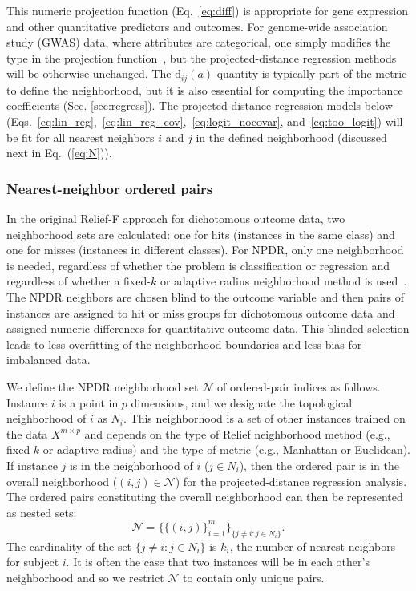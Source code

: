 \documentclass[10pt]{article}
\begin{document}
This numeric projection function (Eq.~\ref{eq:diff}) is appropriate for gene expression and other quantitative predictors and outcomes. For genome-wide association study (GWAS) data, where attributes are categorical, one simply modifies the type in the projection function~\cite{titv}, but the projected-distance regression methods will be otherwise unchanged. The $\text{d}_{ij}(a)$ quantity is typically part of the metric to define the neighborhood, but it is also essential for computing the importance coefficients (Sec. \ref{sec:regress}).  The projected-distance regression models below (Eqs.~\ref{eq:lin_reg},~\ref{eq:lin_reg_cov},~\ref{eq:logit_nocovar}, and~\ref{eq:too_logit}) will be fit for all nearest neighbors $i$ and $j$ in the defined neighborhood (discussed next in Eq.~(\ref{eq:N})). 

\subsubsection{Nearest-neighbor ordered pairs}
In the original Relief-F approach for dichotomous outcome data, two neighborhood sets are calculated: one for hits (instances in the same class) and one for misses (instances in different classes).
For NPDR, only one neighborhood is needed, regardless of whether the problem is classification or regression and regardless of whether a fixed-$k$ or adaptive radius neighborhood method is used~\cite{greene09,urbanowicz17,mckinney13}. The NPDR neighbors are chosen blind to the outcome variable and then pairs of instances are assigned to hit or miss groups for dichotomous outcome data and assigned numeric differences for quantitative outcome data. This blinded selection leads to less overfitting of the neighborhood boundaries and less bias for imbalanced data.     

We define the NPDR neighborhood set $\mathcal{N}$ of ordered-pair indices as follows. Instance $i$ is a point in $p$ dimensions, and we designate the topological neighborhood of $i$ as $N_{i}$. This neighborhood is a set of other instances trained on the data $X^{m \times p}$ and depends on the type of Relief neighborhood method (e.g., fixed-$k$ or adaptive radius) and the type of metric (e.g., Manhattan or Euclidean). If instance $j$ is in the neighborhood of $i$ ($j \in N_{i}$), then the ordered pair is in the overall neighborhood ($(i,j) \in \mathcal{N}$) for the projected-distance regression analysis. The ordered pairs constituting the overall neighborhood can then be represented as nested sets:
\begin{equation}\label{eq:N}
\mathcal{N}=\{\{(i, j)\}_{i=1}^{m}\}_{\{j \ne i : j \in N_{i}\}}.
\end{equation}
The cardinality of the set $\{j \ne i : j \in N_{i}\}$ is $k_i$, the number of nearest neighbors for subject $i$. It is often the case that two instances will be in each other's neighborhood and so we restrict $\mathcal{N}$ to contain only unique pairs.  
\end{document}
